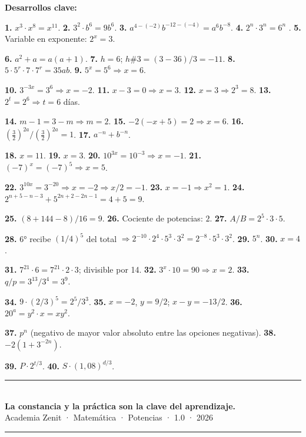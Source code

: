 \documentclass[11pt, letterpaper]{article}
\begin{document}
\medskip
\textbf{Desarrollos clave:}

\textbf{1.} $x^3\cdot x^8=x^{11}$. \quad \textbf{2.} $3^2\cdot b^6=9b^6$. \quad \textbf{3.} $a^{4-(-2)}b^{-12-(-4)}=a^6b^{-8}$. \quad \textbf{4.} $2^n\cdot3^n=6^n$ \checkmark{}. \quad \textbf{5.} Variable en exponente: $2^x=3$.

\textbf{6.} $a^2+a=a(a+1)$. \quad \textbf{7.} $h=6$; $h\#3=(3-36)/3=-11$. \quad \textbf{8.} $5\cdot5^r\cdot7\cdot7^r=35ab$. \quad \textbf{9.} $5^x=5^6\Rightarrow x=6$.

\textbf{10.} $3^{-3x}=3^6\Rightarrow x=-2$. \quad \textbf{11.} $x-3=0\Rightarrow x=3$. \quad \textbf{12.} $x=3\Rightarrow2^3=8$. \quad \textbf{13.} $2^t=2^6\Rightarrow t=6$ días.

\textbf{14.} $m-1=3-m\Rightarrow m=2$. \quad \textbf{15.} $-2(-x+5)=2\Rightarrow x=6$. \quad \textbf{16.} $\left(\frac{3}{2}\right)^{2a}/\left(\frac{3}{2}\right)^{2a}=1$. \quad \textbf{17.} $a^{-n}+b^{-n}$.

\textbf{18.} $x=11$. \quad \textbf{19.} $x=3$. \quad \textbf{20.} $10^{3x}=10^{-3}\Rightarrow x=-1$. \quad \textbf{21.} $(-7)^x=(-7)^5\Rightarrow x=5$.

\textbf{22.} $3^{10x}=3^{-20}\Rightarrow x=-2\Rightarrow x/2=-1$. \quad \textbf{23.} $x=-1\Rightarrow x^2=1$. \quad \textbf{24.} $2^{n+5-n-3}+5^{2n+2-2n-1}=4+5=9$.

\textbf{25.} $(8+144-8)/16=9$. \quad \textbf{26.} Cociente de potencias: $2$. \quad \textbf{27.} $A/B=2^5\cdot3\cdot5$.

\textbf{28.} 6° recibe $(1/4)^5$ del total $\Rightarrow 2^{-10}\cdot2^4\cdot5^3\cdot3^2=2^{-8}\cdot5^3\cdot3^2$. \quad \textbf{29.} $5^n$. \quad \textbf{30.} $x=4$.

\textbf{31.} $7^{21}\cdot6=7^{21}\cdot2\cdot3$; divisible por 14. \quad \textbf{32.} $3^x\cdot10=90\Rightarrow x=2$. \quad \textbf{33.} $q/p=3^{13}/3^4=3^9$.

\textbf{34.} $9\cdot(2/3)^5=2^5/3^3$. \quad \textbf{35.} $x=-2$, $y=9/2$; $x-y=-13/2$. \quad \textbf{36.} $20^a=y^2\cdot x=xy^2$.

\textbf{37.} $p^n$ (negativo de mayor valor absoluto entre las opciones negativas). \quad \textbf{38.} $-2(1+3^{-2n})$.

\textbf{39.} $P\cdot2^{t/3}$. \quad \textbf{40.} $S\cdot(1{,}08)^{d/3}$.

\vspace{8pt}
\begin{center}
  \rule{\linewidth}{1.5pt}\\[4pt]
  {\large\bfseries\color{zenitnavy} La constancia y la práctica son la clave del aprendizaje.}\\[2pt]
  {\color{zenitgold}\small Academia Zenit · Matemática · Potencias · 1.0 · 2026}
  \rule{\linewidth}{1.5pt}
\end{center}
\end{document}
